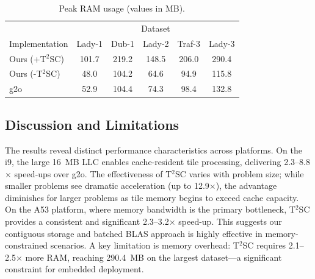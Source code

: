 \begin{table}[!htbp]
\caption{Peak RAM usage (values in MB).}
\label{tab:peak_ram}
\centering
\begin{tabular}{@{}lccccc@{}}
\toprule
& \multicolumn{5}{c}{Dataset} \\
\cmidrule(lr){2-6}
Implementation & Lady-1 & Dub-1 & Lady-2 & Traf-3 & Lady-3 \\
\midrule
Ours (+T$^{2}$SC) & 101.7 & 219.2 & 148.5 & 206.0 & 290.4 \\
Ours (-T$^{2}$SC) &  48.0 & 104.2 &  64.6 &  94.9 & 115.8 \\
g2o             &  52.9 &  104.4 &  74.3 &  98.4 & 132.8 \\
\bottomrule
\end{tabular}
\end{table}

\subsection{Discussion and Limitations}
\label{subsec:results_discussion}
The results reveal distinct performance characteristics across platforms. On the i9, the 
large \SI{16}{MB} LLC enables cache‑resident tile processing, delivering 2.3–8.8$\times$ 
speed‑ups over g2o. The effectiveness of T$^{2}$SC varies with problem size; while smaller 
problems see dramatic acceleration (up to 12.9$\times$), the advantage diminishes for larger 
problems as tile memory begins to exceed cache capacity. On the A53 platform, where memory 
bandwidth is the primary bottleneck, T$^{2}$SC provides a consistent and significant 
2.3–3.2$\times$ speed-up. This suggests our contiguous storage and batched BLAS approach is 
highly effective in memory-constrained scenarios. A key limitation is memory overhead: T$^{2}$SC 
requires 2.1–2.5$\times$ more RAM, reaching \SI{290.4}{MB} on the largest dataset—a significant 
constraint for embedded deployment.